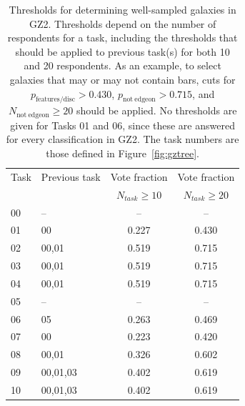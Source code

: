 \begin{table}[t]
\centering
 \begin{tabular*}{\textwidth}{l@{\extracolsep{\fill}}lcc}
 \hline
\multicolumn{1}{l}{Task} &
\multicolumn{1}{l}{Previous task} &
\multicolumn{1}{c}{Vote fraction} &
\multicolumn{1}{c}{Vote fraction}
\\ 
\multicolumn{1}{l}{} &
\multicolumn{1}{l}{} &
\multicolumn{1}{c}{$N_{task}\geq10$} &
\multicolumn{1}{c}{$N_{task}\geq20$}
\\ 
\hline					
00                      & --        & --        & --        \\
01                      & 00        & 0.227     & 0.430     \\
02                      & 00,01     & 0.519     & 0.715     \\
03                      & 00,01     & 0.519     & 0.715     \\
04                      & 00,01     & 0.519     & 0.715     \\
05                      & --        & --        & --        \\
06                      & 05        & 0.263     & 0.469     \\
07                      & 00        & 0.223     & 0.420     \\
08                      & 00,01     & 0.326     & 0.602     \\
09                      & 00,01,03  & 0.402     & 0.619     \\
10                      & 00,01,03  & 0.402     & 0.619     \\
\hline
\end{tabular*}
\caption[Thresholds for selecting sub-samples of galaxies using GZ2 data]{Thresholds for determining well-sampled galaxies in GZ2. Thresholds depend on the number of respondents for a task, including the thresholds that should be applied to previous task(s) for both 10 and 20 respondents. As an example, to select galaxies that may or may not contain bars, cuts for $p_\mathrm{features/disc}>0.430$, $p_\mathrm{not~edgeon}>0.715$, and $N_\mathrm{not~edgeon}\geq20$ should be applied. No thresholds are given for Tasks 01 and 06, since these are answered for every classification in GZ2. The task numbers are those defined in Figure~\ref{fig:gztree}.}
\label{table:votes}
\end{table}

